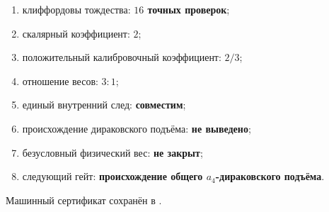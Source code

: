 \begin{protocol}
\begin{enumerate}
 \item клиффордовы тождества: \textbf{$16$ точных проверок};
 \item скалярный коэффициент: \textbf{$2$};
 \item положительный калибровочный коэффициент: \textbf{$2/3$};
 \item отношение весов: \textbf{$3:1$};
 \item единый внутренний след: \textbf{совместим};
 \item происхождение дираковского подъёма: \textbf{не выведено};
 \item безусловный физический вес: \textbf{не закрыт};
 \item следующий гейт: \textbf{происхождение общего $a_4$-дираковского подъёма}.
\end{enumerate}
\end{protocol}

Машинный сертификат сохранён в
.